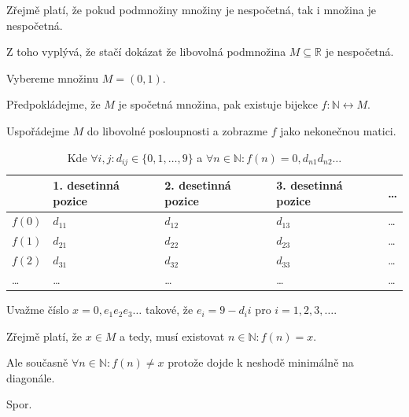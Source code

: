 \begin{compactitem}
    \item Zřejmě platí, že pokud podmnožiny množiny je nespočetná, tak i množina je nespočetná. \begin{compactitem}
        \item Z toho vyplývá, že stačí dokázat že libovolná podmnožina $M \subseteq \mathbb{R}$ je nespočetná.
        \item Vybereme množinu $M = (0, 1)$.
    \end{compactitem}

    \item Předpokládejme, že $M$ je spočetná množina, pak existuje bijekce $f : \mathbb{N} \leftrightarrow M$.

    \item Uspořádejme $M$ do libovolné posloupnosti a zobrazme $f$ jako nekonečnou matici.

    \begin{table}[H]
        \begin{tabular}{l|llll}
            & 1. desetinná pozice & 2. desetinná pozice & 3. desetinná pozice & \dots \\ \hline
            $f(0)$ & $d_{11}$ & $d_{12}$ & $d_{13}$ & \dots \\
            $f(1)$ & $d_{21}$ & $d_{22}$ & $d_{23}$ & \dots \\
            $f(2)$ & $d_{31}$ & $d_{32}$ & $d_{33}$ & \dots \\
            \dots  & \dots    & \dots    & \dots    & \dots \\
        \end{tabular}
        \caption*{Kde $\forall i,j : d_{ij} \in \{ 0, 1, \dots, 9 \}$ a $\forall n \in \mathbb{N} : f(n) = 0, d_{n1} d_{n2} \dots$}
    \end{table}

    \item Uvažme číslo $x = 0, e_1 e_2 e_3 \dots$ takové, že $e_i = 9 - d_ii$ pro $i = 1, 2, 3, \dots$.

    \item Zřejmě platí, že $x \in M$ a tedy, musí existovat $n \in \mathbb{N} : f(n) = x$.

    \item Ale současně $\forall n \in \mathbb{N} : f(n) \not= x$ protože dojde k neshodě minimálně na diagonále. \begin{compactitem}
        \item Spor.
    \end{compactitem}
\end{compactitem}

